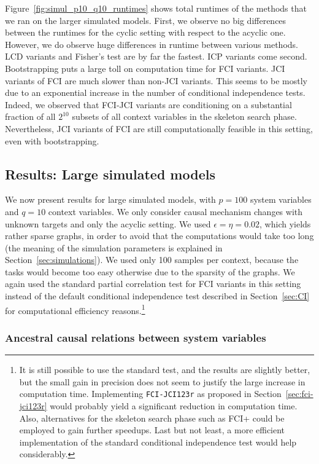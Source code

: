 \documentclass[twoside,11pt]{article}
\newcommand{\alg}[1]{\texttt{#1}}
\begin{document}
Figure~\ref{fig:simul_p10_q10_runtimes} shows total runtimes of the methods that we ran on the larger simulated models.
First, we observe no big differences between the runtimes for the cyclic setting with respect to the acyclic one.
However, we do observe huge differences in runtime between various methods.
LCD variants and Fisher's test are by far the fastest. 
ICP variants come second. 
Bootstrapping puts a large toll on computation time for FCI variants.
JCI variants of FCI are much slower than non-JCI variants.
This seems to be mostly due to an exponential increase in the number of conditional independence tests. 
Indeed, we observed that FCI-JCI variants are conditioning on a substantial fraction of all $2^{10}$ subsets of all context variables in the skeleton search phase.
Nevertheless, JCI variants of FCI are still computationally feasible in this setting, even with bootstrapping.

\subsection{Results: Large simulated models}

We now present results for large simulated models, with $p=100$ system variables and $q=10$ context variables.
We only consider causal mechanism changes with unknown targets and only the acyclic setting.
We used $\epsilon=\eta=0.02$, which
yields rather sparse graphs, in order to avoid that the computations would take too long
(the meaning of the simulation parameters is explained in Section~\ref{sec:simulations}).
We used only 100 samples per context, because the tasks would become too easy otherwise due to the sparsity of the graphs.
We again used the standard partial correlation test for FCI variants in this setting instead
of the default conditional independence test described in Section~\ref{sec:CI} for computational efficiency reasons.\footnote{It is still possible to use the standard test, and the results are slightly better, but the small gain in precision does not seem to justify the large increase in computation time. Implementing \alg{FCI-JCI123r} as proposed in Section~\ref{sec:fci-jci123r} would probably yield a significant reduction in computation time. Also, alternatives for the skeleton search phase such as FCI+ \citep{ClaassenMooijHeskes_UAI_13} could be employed to gain further speedups. Last but not least, a more efficient implementation of the standard conditional independence test would help considerably.}

\subsubsection{Ancestral causal relations between system variables}
\end{document}
